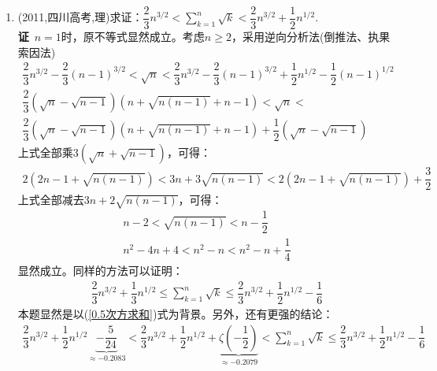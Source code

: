\begin{enumerate}[label={【\textbf{例\thechapter.\arabic*}】},
 leftmargin=\inteval{\myenumleftmargin}pt,
 itemsep=\inteval{\myenumitempsep}pt,
 itemindent=\inteval{\myenumitemindent}pt]
\item (2011,四川高考,理)求证：$ \dfrac{2}{3}n^{3/2}<\sum\limits_{k=1}^{n}\sqrt{k}<
\dfrac{2}{3}n^{3/2}+\dfrac{1}{2}n^{1/2} $. \\
\textbf{证}\ $ n=1 $时，原不等式显然成立。考虑$ n\geq 2 $，采用逆向分析法(倒推法、执果索因法)
\begin{gather*}
    \dfrac{2}{3}n^{3/2}-\dfrac{2}{3}(n-1)^{3/2}<\sqrt{n}<
    \dfrac{2}{3}n^{3/2}-\dfrac{2}{3}(n-1)^{3/2}+\dfrac{1}{2}n^{1/2}
    -\dfrac{1}{2}(n-1)^{1/2} \\
    \dfrac{2}{3}(\sqrt{n}-\sqrt{n-1})(n+\sqrt{n(n-1)}+n-1)<\sqrt{n}< \\
    \dfrac{2}{3}(\sqrt{n}-\sqrt{n-1})(n+\sqrt{n(n-1)}+n-1)+
    \dfrac{1}{2}(\sqrt{n}-\sqrt{n-1}) 
\end{gather*}
上式全部乘$ 3(\sqrt{n}+\sqrt{n-1}) $，可得：
\begin{gather*}
    2\left(2n-1+\sqrt{n(n-1)}\right)<3n+3\sqrt{n(n-1)}<
    2\left(2n-1+\sqrt{n(n-1)}\right)+\dfrac{3}{2} 
\end{gather*}
上式全部减去$ 3n+2\sqrt{n(n-1)} $，可得：
\begin{gather*}
    n-2< \sqrt{n(n-1)}<n-\dfrac{1}{2} \\
    n^2-4n+4<n^2-n<n^2-n+\dfrac{1}{4}
\end{gather*}
显然成立。同样的方法可以证明：
\begin{gather*}
    \dfrac{2}{3}n^{3/2}+\dfrac{1}{3}n^{1/2}\leq\sum\limits_{k=1}^{n}\sqrt{k}
    \leq \dfrac{2}{3}n^{3/2}+\dfrac{1}{2}n^{1/2}-\dfrac{1}{6} 
\end{gather*}
本题显然是以(\ref{0.5次方求和})式为背景。另外，还有更强的结论：
\begin{gather*}
    \dfrac{2}{3}n^{3/2}+\dfrac{1}{2}n^{1/2}
    \underbrace{-\dfrac{5}{24}}_{\approx -0.2083}
    <\dfrac{2}{3}n^{3/2}+\dfrac{1}{2}n^{1/2}+
    \underbrace{\zeta\left(-\dfrac{1}{2}\right)}_{\approx -0.2079}  
    < \sum\limits_{k=1}^{n} \sqrt{k}\leq \dfrac{2}{3}n^{3/2}
    +\dfrac{1}{2}n^{1/2}-\dfrac{1}{6} 
\end{gather*}


\end{enumerate}
